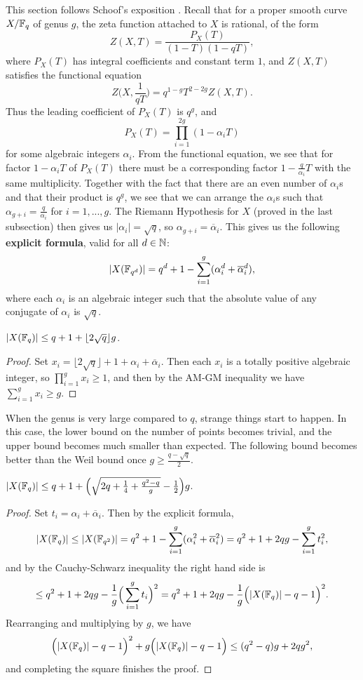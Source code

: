 \documentclass[letterpaper,11pt]{article}
\begin{document}
This section follows Schoof's exposition \cite{schoof}. Recall that for a proper smooth curve $X/\mathbb{F}_q$ of genus $g$, the zeta function attached to $X$ is rational, of the form
\[
Z(X,T) = \frac{P_X(T)}{(1-T)(1-qT)},
\]
where $P_X(T)$ has integral coefficients and constant term $1$, and $Z(X,T)$ satisfies the functional equation
\[
Z\Big(X,\frac{1}{qT}\Big) = q^{1-g}T^{2-2g}Z(X,T).
\]
Thus the leading coefficient of $P_X(T)$ is $q^g$, and
\[
P_X(T) = \prod_{i=1}^{2g} (1-\alpha_iT)
\]
for some algebraic integers $\alpha_i$. From the functional equation, we see that for factor $1-\alpha_iT$ of $P_X(T)$ there must be a corresponding factor $1-\frac{q}{\alpha_i}T$ with the same multiplicity. Together with the fact that there are an even number of $\alpha_i$s and that their product is $q^g$, we see that we can arrange the $\alpha_i$s such that $\alpha_{g+i} = \frac{q}{\alpha_i}$ for $i = 1, ..., g$. The Riemann Hypothesis for $X$ (proved in the last subsection) then gives us $|\alpha_i| = \sqrt{q}$, so $\alpha_{g+i} = \overline{\alpha}_i$. This gives us the following {\bf explicit formula}, valid for all $d \in \mathbb{N}$:
\[
|X(\mathbb{F}_{q^d})| = q^d + 1 - \sum_{i=1}^g (\alpha_i^d + \overline{\alpha}_i^d),
\]
where each $\alpha_i$ is an algebraic integer such that the absolute value of any conjugate of $\alpha_i$ is $\sqrt{q}$.

\begin{thm} $|X(\mathbb{F}_q)| \le q+1+\lfloor2\sqrt{q}\rfloor g$.
\end{thm}
\begin{proof} Set $x_i = \lfloor 2\sqrt{q}\rfloor + 1 + \alpha_i + \overline{\alpha}_i$. Then each $x_i$ is a totally positive algebraic integer, so $\prod_{i=1}^g x_i \ge 1$, and then by the AM-GM inequality we have $\sum_{i=1}^g x_i \ge g$.
\end{proof}

When the genus is very large compared to $q$, strange things start to happen. In this case, the lower bound on the number of points becomes trivial, and the upper bound becomes much smaller than expected. The following bound becomes better than the Weil bound once $g \ge \frac{q-\sqrt{q}}{2}$.

\begin{thm}[Ihara] $|X(\mathbb{F}_q)| \le q+1 + \Big(\sqrt{2q+\frac{1}{4} + \frac{q^2-q}{g}} - \frac{1}{2}\Big)g$.
\end{thm}
\begin{proof} Set $t_i = \alpha_i + \overline{\alpha}_i$. Then by the explicit formula,
\[
|X(\mathbb{F}_q)| \le |X(\mathbb{F}_{q^2})| = q^2 + 1 - \sum_{i=1}^g (\alpha_i^2 + \overline{\alpha}_i^2) = q^2 + 1 + 2qg - \sum_{i=1}^g t_i^2,
\]
and by the Cauchy-Schwarz inequality the right hand side is
\[
\le q^2 + 1 + 2qg - \frac{1}{g}\Big(\sum_{i=1}^g t_i\Big)^2 = q^2 + 1 + 2qg - \frac{1}{g}\Big(|X(\mathbb{F}_q)|-q-1\Big)^2.
\]
Rearranging and multiplying by $g$, we have
\[
\Big(|X(\mathbb{F}_q)|-q-1\Big)^2 + g\Big(|X(\mathbb{F}_q)|-q-1\Big) \le (q^2-q)g + 2qg^2,
\]
and completing the square finishes the proof.
\end{proof}
\end{document}
